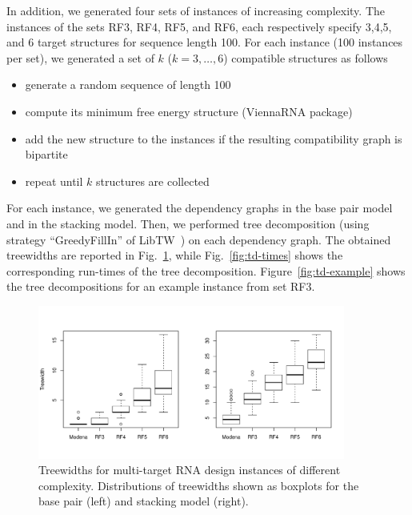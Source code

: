 \documentclass{bioinfo}
\begin{document}
In addition, we generated four sets of instances of increasing
complexity. The instances of the sets RF3, RF4, RF5, and RF6, each
respectively specify 3,4,5, and 6 target structures for sequence
length 100.  For each instance (100 instances per set), we generated a
set of $k$ ($k=3,\dots,6$) compatible structures as follows
\begin{itemize}
\item generate a random sequence of length 100
\item compute its minimum free energy structure (ViennaRNA package)
\item add the new structure to the instances if the resulting compatibility graph is bipartite
\item repeat until $k$ structures are collected
\end{itemize}
For each instance, we generated the dependency graphs in the base pair
model and in the stacking model. Then, we performed tree decomposition
(using strategy ``GreedyFillIn'' of LibTW~\cite{Dijk2006}) on each dependency
graph. The obtained treewidths are reported in
Fig.~\ref{fig:td-widths}, while Fig.~\ref{fig:td-times} shows the
corresponding run-times of the tree decomposition.
Figure~\ref{fig:td-example} shows the tree decompositions for an example
instance from set RF3.


\begin{figure}
  \centering\includegraphics[width=0.9\textwidth]{Figs/td-widths}
  \vspace*{-24pt}
  \caption{Treewidths for multi-target RNA design instances of
    different complexity. Distributions of treewidths shown as boxplots for the base pair (left) and stacking model (right).}
  \label{fig:td-widths}
\end{figure}
\end{document}
